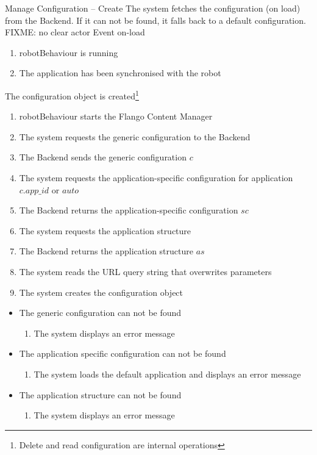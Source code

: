 \begin{suc}
{Manage Configuration -- Create}
{The system fetches the configuration (on load) from the Backend. If it can not be found, it falls back to a default configuration. FIXME: no clear actor}
{Event on-load}
{
	\begin{enumerate}
        \item robotBehaviour is running
        \item The application has been synchronised with the robot
    \end{enumerate}}
{
The configuration object is created\footnote{Delete and read configuration are internal operations}
}
{
    \begin{enumerate}
        \item robotBehaviour starts the Flango Content Manager
        \item The system requests the generic configuration to the Backend
		\item The Backend sends the generic configuration $c$
		\item The system requests the application-specific configuration for application $c.app\_id$ or $auto$
		\item The Backend returns the application-specific configuration $sc$
		\item The system requests the application structure
		\item The Backend returns the application structure $as$
		\item The system reads the URL query string that overwrites parameters
		\item The system creates the configuration object
    \end{enumerate}
}
{    
	\begin{itemize}
        \item The generic configuration can not be found
        \begin{enumerate}
        	\item The system displays an error message
    	\end{enumerate}
    	\item The application specific configuration can not be found
        \begin{enumerate}
        	\item The system loads the default application and displays an error message
    	\end{enumerate}
    	\item The application structure can not be found
        \begin{enumerate}
        	\item The system displays an error message
    	\end{enumerate}
    \end{itemize}   
}
\end{suc}

